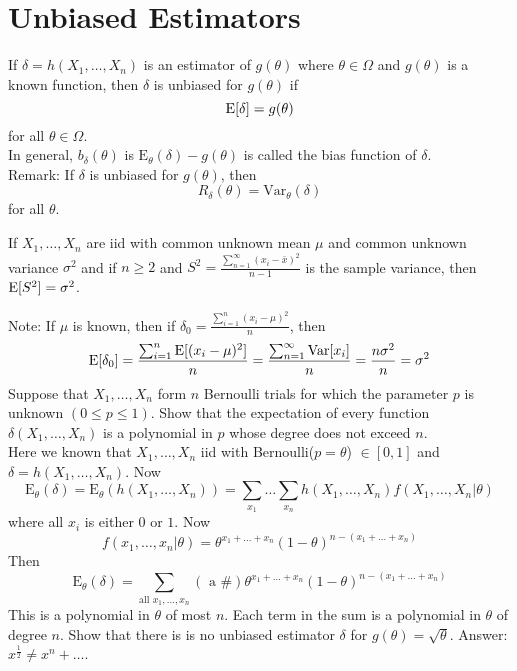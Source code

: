 \documentclass[12pt]{article}
\begin{document}
\section{Unbiased Estimators} 
If $\delta = h(X_1,\dots,X_n)$ is an estimator of $g(\theta)$ where $\theta \in \Omega$ and $g(\theta)$ is a known function, then $\delta$ is unbiased for $g(\theta)$ if $$\mathrm{E}[ \delta ] = g(\theta)$$ for all $\theta \in \Omega$. \\
In general, $b_\delta(\theta)$ is $\mathrm{E}_\theta(\delta) - g(\theta)$ is called the bias function of $\delta$. \\
Remark: If $\delta$ is unbiased for $g(\theta)$, then $$R_\delta(\theta) = \mathrm{Var}_\theta(\delta) $$ for all $\theta$. 
\begin{theorem} If $X_1,\dots,X_n$ are iid with common unknown mean $\mu$ and common unknown variance $\sigma^2$ and if $n \geq 2$ and $S^2 = \frac{\sum_{n=1}^\infty (x_i - \bar{x})^2}{n-1}$ is the sample variance, then $\mathrm{E}[ S^2 ] = \sigma^2$. \end{theorem} 
Note: If $\mu$ is known, then if $\delta_0 = \frac{\sum_{i=1}^n (x_i - \mu)^2}{n}$, then $$ \mathrm{E}[ \delta_0 ] = \frac{\sum_{i=1}^n \mathrm{E}[ (x_i - \mu)^2 ]}{n} = \frac{\sum_{n=1}^\infty \mathrm{Var}[ x_i ]}{n} = \frac{n\sigma^2}{n} = \sigma^2 $$ 
Suppose that $X_1,\dots,X_n$ form $n$ Bernoulli trials for which the parameter $p$ is unknown $(0 \leq p \leq 1)$. Show that the expectation of every function $\delta(X_1,\dots,X_n)$ is a polynomial in $p$ whose degree does not exceed $n$. \\
Here we known that $X_1,\dots,X_n$ iid with Bernoulli($p = \theta$) $\in [0,1]$ and $\delta = h(X_1,\dots,X_n)$. 
Now $$ \mathrm{E}_\theta(\delta) = \mathrm{E}_\theta(h(X_1,\dots,X_n)) = \sum_{x_1} \dots \sum_{x_n} h(X_1,\dots,X_n)f(X_1,\dots,X_n | \theta) $$ 
where all $x_i$ is either $0$ or $1$. 
Now $$f(x_1,\dots,x_n | \theta) = \theta^{x_1 + \dots + x_n}(1 - \theta)^{n - (x_1 + \dots + x_n)} $$ Then $$ \mathrm{E}_\theta(\delta) = \sum_{\text{all }x_1,\dots,x_n} (\text{ a \# }) \theta^{x_1 + \dots + x_n}(1 - \theta)^{n - (x_1 + \dots + x_n)} $$ This is a polynomial in $\theta$ of most $n$. Each term in the sum is a polynomial in $\theta$ of degree $n$. Show that there is is no unbiased estimator $\delta$ for $g(\theta) = \sqrt{\theta}$. Answer: $x^{\frac{1}{2}} \neq x^n + \dots $. \\~\\
\end{document}

